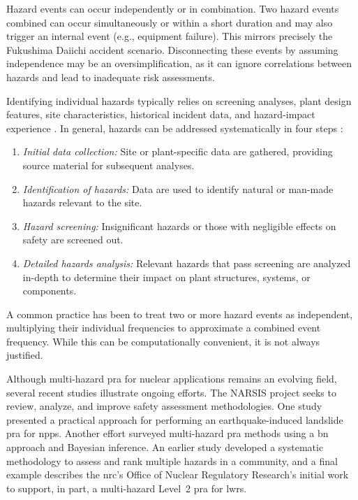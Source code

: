 Hazard events can occur independently or in combination. Two hazard events combined can occur simultaneously or within a short duration and may also trigger an internal event (e.g., equipment failure). This mirrors precisely the Fukushima Daiichi accident scenario. Disconnecting these events by assuming independence may be an oversimplification, as it can ignore correlations between hazards and lead to inadequate risk assessments.

Identifying individual hazards typically relies on screening analyses, plant design features, site characteristics, historical incident data, and hazard-impact experience \cite{Prosek2017Methodology}. In general, hazards can be addressed systematically in four steps \cite{Daniell2019Review}:

\begin{enumerate}
\item \textit{Initial data collection:} Site or plant-specific data are gathered, providing source material for subsequent analyses.
\item \textit{Identification of hazards:} Data are used to identify natural or man-made hazards relevant to the site.
\item \textit{Hazard screening:} Insignificant hazards or those with negligible effects on safety are screened out.
\item \textit{Detailed hazards analysis:} Relevant hazards that pass screening are analyzed in-depth to determine their impact on plant structures, systems, or components.
\end{enumerate}

A common practice has been to treat two or more hazard events as independent, multiplying their individual frequencies to approximate a combined event frequency. While this can be computationally convenient, it is not always justified.

Although multi-hazard \acrshort{pra} for nuclear applications remains an evolving field, several recent studies illustrate ongoing efforts. The NARSIS project \cite{Home} seeks to review, analyze, and improve safety assessment methodologies. One study \cite{Kwag2018Development} presented a practical approach for performing an earthquake-induced landslide \acrshort{pra} for \acrshort{npp}s. Another effort \cite{Kwag2017Probabilistic} surveyed multi-hazard \acrshort{pra} methods using a \acrshort{bn} approach and Bayesian inference. An earlier study \cite{Li2009Ranking} developed a systematic methodology to assess and rank multiple hazards in a community, and a final example \cite{Cooper2013What} describes the \acrshort{nrc}'s Office of Nuclear Regulatory Research's initial work to support, in part, a multi-hazard Level~2 \acrshort{pra} for \acrshort{lwr}s.

